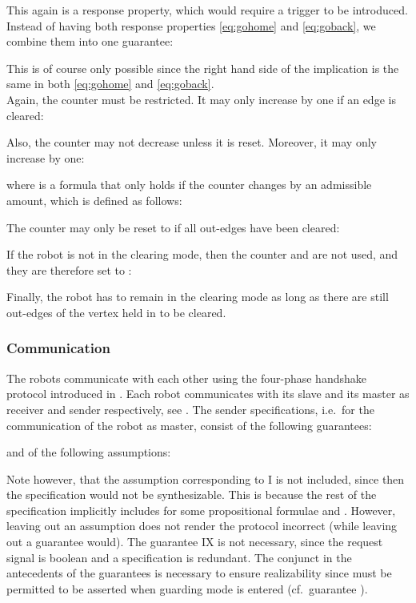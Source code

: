 This again is a response property, which would require a trigger to be introduced. Instead of having both response properties \eqref{eq:gohome} and \eqref{eq:goback}, we combine them into one guarantee:

This is of course only possible since the right hand side of the implication  is the same in both \eqref{eq:gohome} and \eqref{eq:goback}.\\

Again, the counter  must be restricted. It may only increase by one if an edge is cleared:

Also, the counter may not decrease unless it is reset. Moreover, it may only increase by one:

where  is a formula that only holds if the counter changes by an admissible amount, which is defined as follows:

The counter may only be reset to  if all out-edges have been cleared:


If the robot is not in the clearing mode, then the counter  and  are not used, and they are therefore set to :

Finally, the robot has to remain in the clearing mode as long as there are still out-edges of the vertex held in  to be cleared.



\subsubsection{Communication}

The robots communicate with each other using the four-phase handshake protocol introduced in . Each robot communicates with its slave and its master as receiver and sender respectively, see . The sender specifications, i.e.\ for the communication of the robot as master, consist of the following guarantees:

and of the following assumptions:

Note however, that the assumption  corresponding to I is not included, since then the specification would not be synthesizable. This is because the rest of the specification implicitly includes  for some propositional formulae  and . However, leaving out an assumption does not render the protocol incorrect (while leaving out a guarantee would). The guarantee IX is not necessary, since the request signal  is boolean and a specification  is redundant. The conjunct  in the antecedents of the guarantees is necessary to ensure realizability since  must be permitted to be asserted when guarding mode is entered (cf.\ guarantee ).\\


